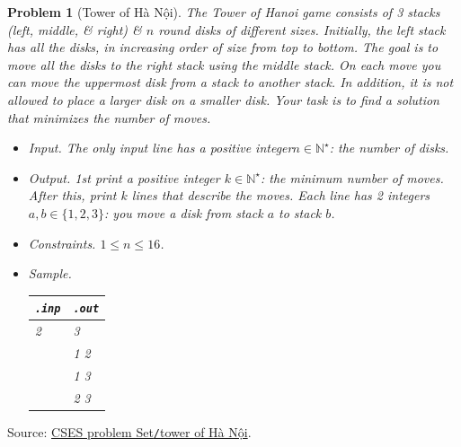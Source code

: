 \documentclass{article}
\newtheorem{problem}{Problem}
\begin{document}
\begin{problem}[Tower of Hà Nội]
	The Tower of Hanoi game consists of 3 stacks (left, middle, \& right) \& $n$ round disks of different sizes. Initially, the left stack has all the disks, in increasing order of size from top to bottom. The goal is to move all the disks to the right stack using the middle stack. On each move you can move the uppermost disk from a stack to another stack. In addition, it is not allowed to place a larger disk on a smaller disk. Your task is to find a solution that minimizes the number of moves.
	\begin{itemize}
		\item {\sf Input.} The only input line has a positive integer$n\in\mathbb{N}^\star$: the number of disks.
		\item {\sf Output.} 1st print a positive integer $k\in\mathbb{N}^\star$: the minimum number of moves. After this, print $k$ lines that describe the moves. Each line has 2 integers $a,b\in\{1,2,3\}$: you move a disk from stack $a$ to stack $b$.
		\item {\sf Constraints.} $1\le n\le16$.
		\item {\sf Sample.}
		\begin{table}[H]
			\centering
			\begin{tabular}{|l|l|}
				\hline
				\verb|.inp| & \verb|.out| \\
				\hline
				2 & 3 \\
				& 1 2 \\
				& 1 3 \\
				& 2 3 \\
				\hline
			\end{tabular}
		\end{table}
	\end{itemize}
\end{problem}
Source: \href{https://cses.fi/problemset/task/2165}{CSES problem Set{\tt/}tower of Hà Nội}.
\end{document}
